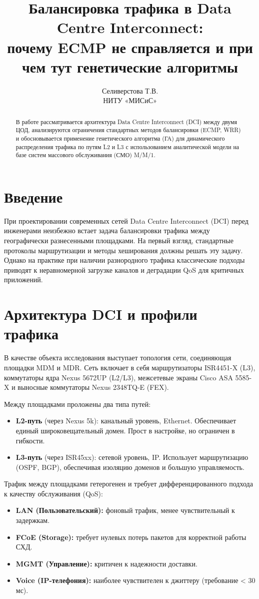 \documentclass[10pt,twocolumn,a4paper]{article}
\title{\textbf{Балансировка трафика в Data Centre Interconnect: \\ почему ECMP не справляется и при чем тут генетические алгоритмы}}
\author{Селиверстова Т.В. \\ \small НИТУ «МИСиС»}
\date{}
\begin{document}
\maketitle

\begin{abstract}
В работе рассматривается архитектура Data Centre Interconnect (DCI) между двумя ЦОД, анализируются ограничения стандартных методов балансировки (ECMP, WRR) и обосновывается применение генетического алгоритма (ГА) для динамического распределения трафика по путям L2 и L3 с использованием аналитической модели на базе систем массового обслуживания (СМО) M/M/1.
\end{abstract}

\section{Введение}
При проектировании современных сетей Data Centre Interconnect (DCI) перед инженерами неизбежно встает задача балансировки трафика между географически разнесенными площадками. На первый взгляд, стандартные протоколы маршрутизации и методы хеширования должны решать эту задачу. Однако на практике при наличии разнородного трафика классические подходы приводят к неравномерной загрузке каналов и деградации QoS для критичных приложений.

\section{Архитектура DCI и профили трафика}
В качестве объекта исследования выступает топология сети, соединяющая площадки MDM и MDR. Сеть включает в себя маршрутизаторы ISR4451-X (L3), коммутаторы ядра Nexus 5672UP (L2/L3), межсетевые экраны Cisco ASA 5585-X и выносные коммутаторы Nexus 2348TQ-E (FEX).

Между площадками проложены два типа путей:
\begin{itemize}
    \item \textbf{L2-путь} (через Nexus 5k): канальный уровень, Ethernet. Обеспечивает единый широковещательный домен. Прост в настройке, но ограничен в гибкости.
    \item \textbf{L3-путь} (через ISR45xx): сетевой уровень, IP. Использует маршрутизацию (OSPF, BGP), обеспечивая изоляцию доменов и большую управляемость.
\end{itemize}

Трафик между площадками гетерогенен и требует дифференцированного подхода к качеству обслуживания (QoS):
\begin{itemize}
    \item \textbf{LAN (Пользовательский):} фоновый трафик, менее чувствительный к задержкам.
    \item \textbf{FCoE (Storage):} требует нулевых потерь пакетов для корректной работы СХД.
    \item \textbf{MGMT (Управление):} критичен к надежности доставки.
    \item \textbf{Voice (IP-телефония):} наиболее чувствителен к джиттеру (требование < 30 мс).
\end{itemize}
\end{document}
